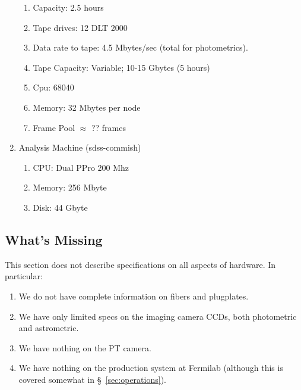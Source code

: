 \begin{enumerate}
\begin{enumerate}
\item Capacity: 2.5 hours

\item Tape drives: 12 DLT 2000

\item Data rate to tape: 4.5 Mbytes/sec (total for photometrics).

\item Tape Capacity: Variable; 10-15 Gbytes (5 hours)

\item Cpu: 68040

\item Memory: 32 Mbytes per node

\item Frame Pool $\approx$ ?? frames
\end{enumerate}

\item Analysis Machine (sdss-commish)
\begin{enumerate} 
\item CPU: Dual PPro 200 Mhz

\item Memory: 256 Mbyte

\item Disk: 44 Gbyte
\end{enumerate}
\end{enumerate}

\subsection{What's Missing}

This section does not describe specifications on all aspects of
hardware.  In particular: 
\begin{enumerate} 
\item We do not have complete information on fibers and plugplates.
\item We have only limited specs on the imaging camera CCDs, both photometric
and astrometric. 
\item We have nothing on the PT camera.
\item We have nothing on the production system at Fermilab (although
this is covered somewhat in \S~\ref{sec:operations}). 
\end{enumerate}






